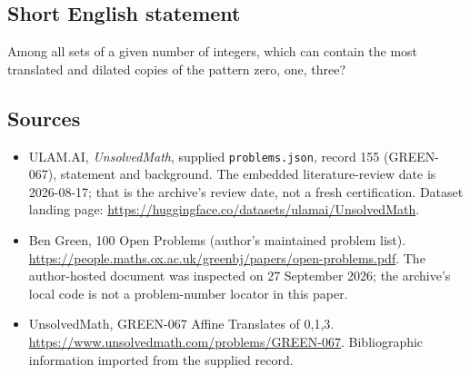\documentclass[11pt,a4paper]{article}
\begin{document}
\subsection{Short English statement}

Among all sets of a given number of integers, which can contain the most translated and dilated copies of the pattern zero, one, three?

\subsection{Sources}

{\small

\begin{itemize}

\item[\hypertarget{source:155:1}{S1}] ULAM.AI, \emph{UnsolvedMath}, supplied \texttt{problems.json}, record 155 (GREEN-067), statement and background. The embedded literature-review date is 2026-08-17; that is the archive’s review date, not a fresh certification. Dataset landing page: \url{https://huggingface.co/datasets/ulamai/UnsolvedMath}.

\item[\hypertarget{source:155:2}{S2}] Ben Green, 100 Open Problems (author’s maintained problem list). \url{https://people.maths.ox.ac.uk/greenbj/papers/open-problems.pdf}. The author-hosted document was inspected on 27 September 2026; the archive’s local code is not a problem-number locator in this paper.

\item[\hypertarget{source:155:3}{S3}] UnsolvedMath, GREEN-067 Affine Translates of {0,1,3}. \url{https://www.unsolvedmath.com/problems/GREEN-067}. Bibliographic information imported from the supplied record.

\end{itemize}

}

\label{end:155}
\end{document}
